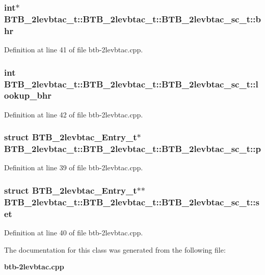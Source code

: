 \subsubsection[{bhr}]{\setlength{\rightskip}{0pt plus 5cm}int$\ast$ BTB\_\-2levbtac\_\-t::BTB\_\-2levbtac\_\-t::BTB\_\-2levbtac\_\-sc\_\-t::bhr}\label{classBTB__2levbtac__t_1_1BTB__2levbtac__sc__t_a653adc6a49678132fbfcdfe48e51152}




Definition at line 41 of file btb-2levbtac.cpp.
\subsubsection[{lookup\_\-bhr}]{\setlength{\rightskip}{0pt plus 5cm}int BTB\_\-2levbtac\_\-t::BTB\_\-2levbtac\_\-t::BTB\_\-2levbtac\_\-sc\_\-t::lookup\_\-bhr}\label{classBTB__2levbtac__t_1_1BTB__2levbtac__sc__t_538f22b4432209d003cccaab9e932a3b}




Definition at line 42 of file btb-2levbtac.cpp.
\subsubsection[{p}]{\setlength{\rightskip}{0pt plus 5cm}struct {\bf BTB\_\-2levbtac\_\-Entry\_\-t}$\ast$ BTB\_\-2levbtac\_\-t::BTB\_\-2levbtac\_\-t::BTB\_\-2levbtac\_\-sc\_\-t::p\hspace{0.3cm}{\tt  [read]}}\label{classBTB__2levbtac__t_1_1BTB__2levbtac__sc__t_5ca66fa2acf3290f54f83bcef9f85f9b}




Definition at line 39 of file btb-2levbtac.cpp.
\subsubsection[{set}]{\setlength{\rightskip}{0pt plus 5cm}struct {\bf BTB\_\-2levbtac\_\-Entry\_\-t}$\ast$$\ast$ BTB\_\-2levbtac\_\-t::BTB\_\-2levbtac\_\-t::BTB\_\-2levbtac\_\-sc\_\-t::set\hspace{0.3cm}{\tt  [read]}}\label{classBTB__2levbtac__t_1_1BTB__2levbtac__sc__t_aa6e7f0a55903442d50b08e40b011e26}




Definition at line 40 of file btb-2levbtac.cpp.

The documentation for this class was generated from the following file:\begin{CompactItemize}
\item 
{\bf btb-2levbtac.cpp}\end{CompactItemize}
